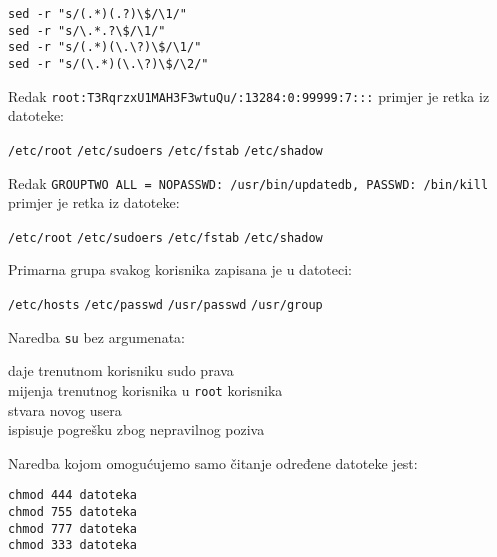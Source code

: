 \documentclass[a4paper,11pt]{exam}
\newcommand{\shell}[1]{\texttt{#1}}
\begin{document}
\begin{questions}
		\begin{oneparchoices}
		\choice \verb|sed -r "s/(.*)(.?)\$/\1/"|  \\
		\choice \verb|sed -r "s/\.*.?\$/\1/"| \\
    \choice \verb|sed -r "s/(.*)(\.\?)\$/\1/"| \\ 
    \choice \verb|sed -r "s/(\.*)(\.\?)\$/\2/"|
	\end{oneparchoices}

	
		\question
	Redak \shell{root:T3RqrzxU1MAH3F3wtuQu/:13284:0:99999:7:::} primjer je retka iz datoteke:
	
	\begin{oneparchoices}
		\choice \shell{/etc/root} 
		\choice \shell{/etc/sudoers} 
		\choice \shell{/etc/fstab} 
		\choice \shell{/etc/shadow}
  \end{oneparchoices}

		\question
	Redak \shell{GROUPTWO    ALL = NOPASSWD: /usr/bin/updatedb, PASSWD: /bin/kill} primjer je retka iz datoteke:
	
	\begin{oneparchoices}
		\choice \shell{/etc/root} 
		\choice \shell{/etc/sudoers} 
		\choice \shell{/etc/fstab} 
		\choice \shell{/etc/shadow}
  \end{oneparchoices}


	\question
	Primarna grupa svakog korisnika zapisana je u datoteci:

	\begin{oneparchoices}
   	\choice \shell{/etc/hosts}
		\choice \shell{/etc/passwd}
		\choice \shell{/usr/passwd} 
		\choice \shell{/usr/group}  
	\end{oneparchoices}

	\question
  Naredba \shell{su} bez argumenata:
	
	\begin{oneparchoices}
		\choice daje trenutnom korisniku sudo prava \\
		\choice mijenja trenutnog korisnika u \shell{root} korisnika \\ 
		\choice stvara novog usera \\
		\choice ispisuje pogrešku zbog nepravilnog poziva
	\end{oneparchoices}
	
	\question
  Naredba kojom omogućujemo samo čitanje određene datoteke jest: 

	\begin{oneparchoices}
		\choice \shell{chmod 444 datoteka}\\ 
		\choice \shell{chmod 755 datoteka} \\
		\choice \shell{chmod 777 datoteka} \\
		\choice \shell{chmod 333 datoteka}
	\end{oneparchoices}
	

\end{questions}
\end{document}
